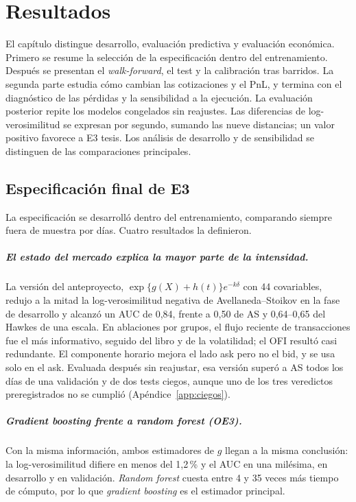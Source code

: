 \chapter{Resultados}
\label{chap:resultados}

El capítulo distingue desarrollo, evaluación predictiva y evaluación económica. Primero se resume la selección de la especificación dentro del entrenamiento. Después se presentan el \textit{walk-forward}, el test y la calibración tras barridos. La segunda parte estudia cómo cambian las cotizaciones y el PnL, y termina con el diagnóstico de las pérdidas y la sensibilidad a la ejecución. La evaluación posterior repite los modelos congelados sin reajustes. Las diferencias de log-verosimilitud se expresan por segundo, sumando las nueve distancias; un valor positivo favorece a E3 tesis. Los análisis de desarrollo y de sensibilidad se distinguen de las comparaciones principales.

\section{Especificación final de E3}
\label{sec:especificacion-final}

La especificación se desarrolló dentro del entrenamiento, comparando siempre fuera de muestra por días. Cuatro resultados la definieron.

\paragraph{El estado del mercado explica la mayor parte de la intensidad.} La versión del anteproyecto, $\exp\{g(X)+h(t)\}e^{-k\delta}$ con 44 covariables, redujo a la mitad la log-verosimilitud negativa de Avellaneda--Stoikov en la fase de desarrollo y alcanzó un AUC de 0,84, frente a 0,50 de AS y 0,64--0,65 del Hawkes de una escala. En ablaciones por grupos, el flujo reciente de transacciones fue el más informativo, seguido del libro y de la volatilidad; el OFI resultó casi redundante. El componente horario mejora el lado ask pero no el bid, y se usa solo en el ask. Evaluada después sin reajustar, esa versión superó a AS todos los días de una validación y de dos tests ciegos, aunque uno de los tres veredictos preregistrados no se cumplió (Apéndice~\ref{app:ciegos}).

\paragraph{Gradient boosting frente a random forest (OE3).} Con la misma información, ambos estimadores de $g$ llegan a la misma conclusión: la log-verosimilitud difiere en menos del 1,2\,\% y el AUC en una milésima, en desarrollo y en validación. \textit{Random forest} cuesta entre 4 y 35 veces más tiempo de cómputo, por lo que \textit{gradient boosting} es el estimador principal.


